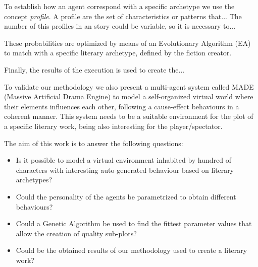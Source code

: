 \documentclass{sig-alternate}
\begin{document}
To establish how an agent correspond with a specific archetype 
we use the concept {\em profile}. A profile are the set of characteristics
 or patterns that... The number of this profiles in an story could be variable, so it is necessary to...

These probabilities are
optimized by means of an Evolutionary Algorithm (EA) to match with a
specific literary archetype, defined by the fiction creator.

Finally, the results of the execution is used to create the...








To validate our methodology we also present a multi-agent system called
MADE (Massive Artificial Drama Engine) to model a self-organized
virtual world where their elements influences each other, following a
cause-effect behaviours in a coherent manner. This system needs to be
a suitable environment for the plot of a specific literary work, being
also interesting for the player/spectator. 

The aim of this work is to answer the following questions:

\begin{itemize}
 \item Is it possible to model a virtual environment inhabited by hundred of characters with interesting auto-generated behaviour based on literary archetypes?
 \item Could the personality of the agents be parametrized to obtain different behaviours?
 \item Could a Genetic Algorithm be used to find the fittest parameter values that allow the creation of quality sub-plots?
 \item Could be the obtained results of our methodology used to create a literary work? %
\end{itemize}

\end{document}
